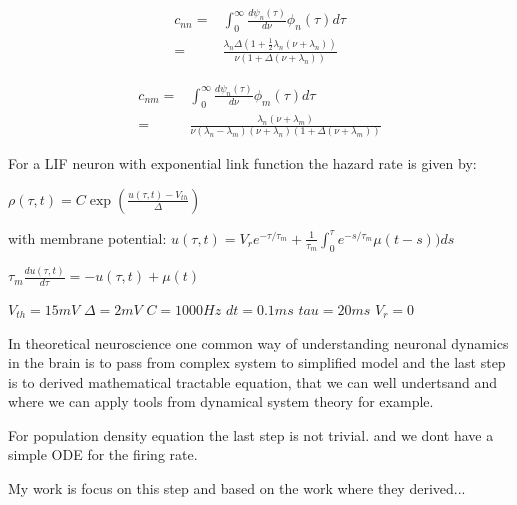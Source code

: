 \documentclass[a4paper,12pt,twoside]{article}
\begin{document}
\begin{align}
c_{nn}=&\int_0^\infty\frac{d\psi_n(\tau)}{d\nu}\phi_n(\tau)d\tau\\
=&\frac{\lambda_n\Delta(1+\frac{1}{2}\lambda_n(\nu+\lambda_n))}{\nu(1+\Delta(\nu+\lambda_n))}
\end{align}


\begin{align}
c_{nm}=&\int_0^\infty\frac{d\psi_n(\tau)}{d\nu}\phi_m(\tau)d\tau\\
=&\frac{\lambda_n(\nu+\lambda_m)}{\nu(\lambda_n-\lambda_m)(\nu+\lambda_n)(1+\Delta(\nu+\lambda_m))}
\end{align}






For a LIF neuron with exponential link function the hazard rate is given by:

$\rho(\tau,t)=C\exp(\frac{u(\tau,t)-V_{th}}{\Delta})$

with membrane potential:
$u(\tau,t)=V_r e^{-\tau/\tau_m}+\frac{1}{\tau_m}\int_0^\tau  e^{-s/\tau_m}\mu(t-s))ds$

$\tau_m\frac{du(\tau,t)}{d\tau}=-u(\tau,t)+\mu(t)$

$V_{th}=15  mV$
$\Delta = 2     mV$
$C=1000 Hz$
$dt=0.1    ms$
$tau=20   ms$
$V_r=0  $


In theoretical neuroscience one common way of understanding neuronal dynamics in the brain is to pass from complex system to simplified model and the last step is to derived mathematical tractable equation, that we can well undertsand and where we can apply  tools from dynamical system theory for example. 

For population density equation the last step is not trivial. and we dont have a simple ODE for the firing rate.

My work is focus on this step and based on the work where they derived...


\newpage

\mbox{}
\nocite{*}
%


\end{document}
